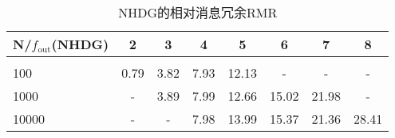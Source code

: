 \begin{table}[htbp]
    \centering
    \caption{NHDG的相对消息冗余RMR}
    \begin{tabular}{lccccccc}
		\toprule
        N/$f_\text{out}$(NHDG) & 2 & 3 & 4 & 5 &6 &7 & 8 \\[1pt]
        \midrule
        \\[-15pt]
        100         & 0.79         & 3.82         & 7.93         & 12.13          & -             & -           & -        \\
        1000        & -            & 3.89         & 7.99         & 12.66          & 15.02         & 21.98       & -        \\
        10000       & -            & -            & 7.98         & 13.99          & 15.37         & 21.36       & 28.41    \\
    \bottomrule
    \end{tabular}
    \label{table:3-dup_NHDG}
\end{table}
